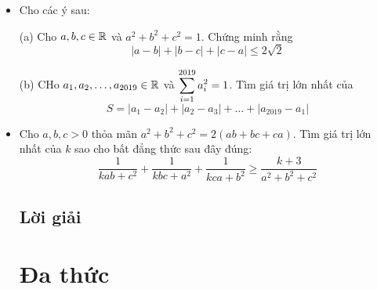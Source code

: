 \documentclass[11pt]{scrartcl}
\begin{document}
\begin{itemize}[label=, leftmargin=0em, itemsep=-0em]
\begin{btvn}
        \end{btvn}
        \item \begin{btvn} Cho các ý sau:
        
            (a) Cho $a,b,c \in \mathbb{R}$ và $a^2 + b^2 + c^2 = 1$. Chứng minh rằng
            \[
                |a - b| + |b - c| + |c - a| \leq 2\sqrt{2}
            \]
    
            (b) CHo $a_1, a_2,\dots,a_{2019} \in \mathbb{R}$ và $\displaystyle\sum_{i = 1}^{2019}a_i^2 = 1$. Tìm giá trị lớn nhất của 
            \[
                S = |a_1 - a_2| + |a_2 - a_3| + \dots + |a_{2019} - a_1|
            \]
            \end{btvn}
        \item \begin{btvn}
            Cho $a,b,c > 0$ thỏa mãn $a^2 + b^2 + c^2 = 2(ab + bc + ca)$. Tìm giá trị lớn nhất của $k$ sao cho bất đẳng thức sau đây đúng:
            \[
                \frac{1}{kab + c^2} + \frac{1}{kbc + a^2} + \frac{1}{kca + b^2} \geq \frac{k + 3}{a^2 + b^2 + c^2}
            \]
        \end{btvn}
        \subsection{\LARGE \textcolor{dk}{Lời giải}}
        
        \newpage
        \thispagestyle{plain}
        
        \section{\huge Đa thức}

\end{itemize}
\end{document}
